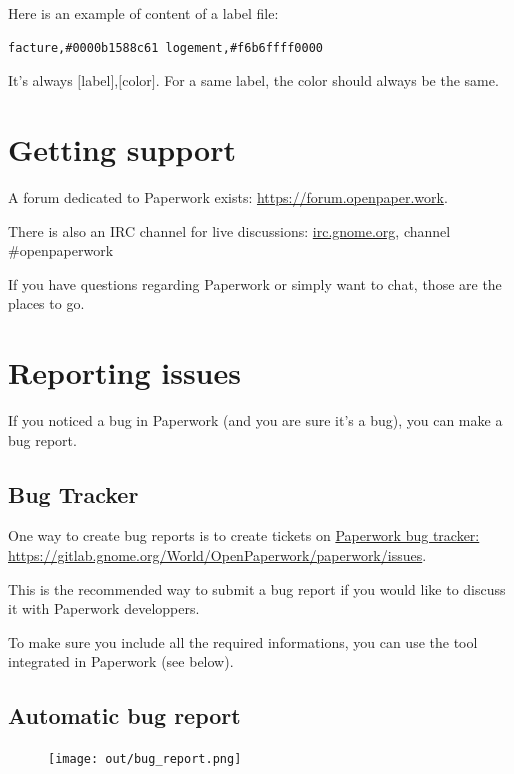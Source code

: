\documentclass[10pt,a4paper]{article}
\begin{document}
Here is an example of content of a label file:
\begin{verbatim}
facture,#0000b1588c61 logement,#f6b6ffff0000
\end{verbatim}
It's always $[$label$]$,$[$color$]$. For a same label, the color should
always be the same.


\section{Getting support}

A forum dedicated to Paperwork exists:
\href{https://forum.openpaper.work}{https://forum.openpaper.work}.

There is also an IRC channel for live discussions:
\href{https://wiki.gnome.org/action/show/GettingInTouch/IRC}{irc.gnome.org}, channel \#openpaperwork

If you have questions regarding Paperwork or simply want to chat, those are
the places to go.

\section{Reporting issues}

If you noticed a bug in Paperwork (and you are sure it's a bug), you can
make a bug report.

\subsection{Bug Tracker}

One way to create bug reports is to create tickets on
\href{https://gitlab.gnome.org/World/OpenPaperwork/paperwork/issues}{Paperwork bug tracker: https://gitlab.gnome.org/World/OpenPaperwork/paperwork/issues}.

This is the recommended way to submit a bug report if you would like to discuss
it with Paperwork developpers.

To make sure you include all the required informations, you can use the
tool integrated in Paperwork (see below).


\subsection{Automatic bug report}

\begin{figure}[H]
	\texttt{[image: out/bug\_report.png]}
\end{figure}
\end{document}
